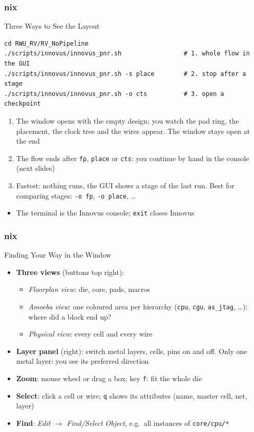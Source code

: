 \documentclass{beamer}
\newcommand{\astitle}{nix}
\newcommand{\assubtitle}{nix}
\newcommand{\cmd}[1]{\texttt{#1}}
\begin{document}
\renewcommand{\assubtitle}{Three Ways to See the Layout}
\begin{frame}[fragile]
\frametitle{\astitle}
\begin{block}{\assubtitle}
  \footnotesize
\begin{lstlisting}[style=sh]
cd RWU_RV/RV_NoPipeline
./scripts/innovus/innovus_pnr.sh                 # 1. whole flow in the GUI
./scripts/innovus/innovus_pnr.sh -s place        # 2. stop after a stage
./scripts/innovus/innovus_pnr.sh -o cts          # 3. open a checkpoint
\end{lstlisting}
  \begin{enumerate}
    \item The window opens with the empty design; you watch the pad ring,
      the placement, the clock tree and the wires appear.
      The window stays open at the end
    \item The flow ends after \cmd{fp}, \cmd{place} or \cmd{cts}: you
      continue by hand in the console (next slides)
    \item Fastest: nothing runs, the GUI shows a stage of the last run.
      Best for comparing stages: \cmd{-o fp}, \cmd{-o place}, \dots
  \end{enumerate}
  \begin{itemize}
    \item The terminal is the Innovus console; \cmd{exit} closes Innovus
  \end{itemize}
\end{block}
\end{frame}

\renewcommand{\assubtitle}{Finding Your Way in the Window}
\begin{frame}
\frametitle{\astitle}
\begin{block}{\assubtitle}
  \footnotesize
  \begin{itemize}
    \item \textbf{Three views} (buttons top right):
    \begin{itemize}
      \item \emph{Floorplan view}: die, core, pads, macros
      \item \emph{Amoeba view}: one coloured area per hierarchy
        (\cmd{cpu}, \cmd{cgu}, \cmd{as\_jtag}, \dots): where did a block end up?
      \item \emph{Physical view}: every cell and every wire
    \end{itemize}
    \item \textbf{Layer panel} (right): switch metal layers, cells, pins on
      and off. Only one metal layer: you see its preferred direction
    \item \textbf{Zoom}: mouse wheel or drag a box; key \cmd{f}: fit the whole die
    \item \textbf{Select}: click a cell or wire; \cmd{q} shows its attributes
      (name, master cell, net, layer)
    \item \textbf{Find}: \emph{Edit $\rightarrow$ Find/Select Object}, e.g.\ all
      instances of \cmd{core/cpu/*}
  \end{itemize}
\end{block}
\end{frame}
\end{document}
